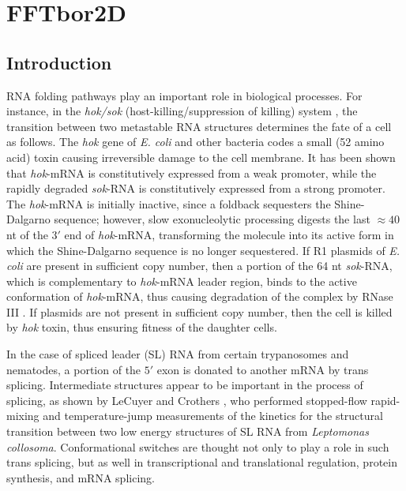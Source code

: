 
\newcommand{\p}{{\bf p}}

\chapter{FFTbor2D} %

\label{FFTbor2D} %


\section{Introduction}

RNA folding pathways play an important role in biological processes.
For instance, in the {\em hok/sok}
(host-killing/suppression of killing) system \citep{Gerdes.arg97},
the transition between two metastable RNA structures determines the
fate of a cell as follows.
The {\em hok} gene of {\em E. coli} and other bacteria
codes a small (52 amino acid) toxin causing irreversible damage to the cell
membrane. It has been shown that {\em hok}-mRNA is
constitutively expressed from a weak promoter, while
the rapidly degraded {\em sok}-RNA is constitutively expressed from
a strong promoter.  The {\em hok}-mRNA is initially
inactive, since a foldback sequesters the
Shine-Dalgarno sequence; however, slow exonucleolytic processing
digests the last $\approx 40$ nt of the $3'$ end of {\em hok}-mRNA,
transforming the molecule into its active form in which
the Shine-Dalgarno sequence is no longer sequestered.
If R1 plasmids of {\em E. coli} are present in
sufficient copy number, then a portion of the 64 nt
{\em sok}-RNA, which is complementary to {\em hok}-mRNA leader
region, binds to the active conformation of {\em hok}-mRNA, thus
causing degradation of the complex by RNase III \citep{Gerdes.arg97}.
If plasmids are not present in sufficient copy number, then the
cell is killed by {\em hok} toxin, thus ensuring fitness of the daughter
cells.

In the case of spliced leader (SL) RNA from certain trypanosomes and nematodes,
a portion of the $5'$ exon is donated to
another mRNA by trans splicing.
Intermediate structures appear to be important in the process of splicing,
as shown by LeCuyer and Crothers \citep{lecuyerCrothers}, who performed
stopped-flow rapid-mixing and temperature-jump measurements
of the kinetics for the structural transition between two low
energy structures of SL RNA from {\em Leptomonas collosoma}.
Conformational switches are thought not only to play a role in such
trans splicing, but as well in transcriptional and
translational regulation, protein synthesis, and mRNA splicing.

